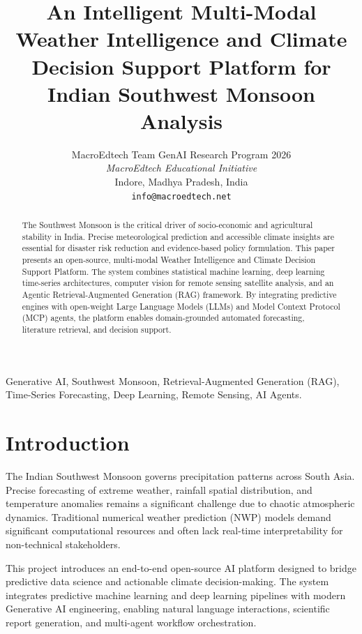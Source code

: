 \documentclass[10pt,journal,compsoc]{IEEEtran}
\begin{document}
\title{An Intelligent Multi-Modal Weather Intelligence and Climate Decision Support Platform for Indian Southwest Monsoon Analysis}

\author{MacroEdtech Team GenAI Research Program 2026\\
\textit{MacroEdtech Educational Initiative}\\
Indore, Madhya Pradesh, India\\
\texttt{info@macroedtech.net}
}

\maketitle

\begin{abstract}
The Southwest Monsoon is the critical driver of socio-economic and agricultural stability in India. Precise meteorological prediction and accessible climate insights are essential for disaster risk reduction and evidence-based policy formulation. This paper presents an open-source, multi-modal Weather Intelligence and Climate Decision Support Platform. The system combines statistical machine learning, deep learning time-series architectures, computer vision for remote sensing satellite analysis, and an Agentic Retrieval-Augmented Generation (RAG) framework. By integrating predictive engines with open-weight Large Language Models (LLMs) and Model Context Protocol (MCP) agents, the platform enables domain-grounded automated forecasting, literature retrieval, and decision support.
\end{abstract}

\begin{IEEEkeywords}
Generative AI, Southwest Monsoon, Retrieval-Augmented Generation (RAG), Time-Series Forecasting, Deep Learning, Remote Sensing, AI Agents.
\end{IEEEkeywords}

\section{Introduction}
The Indian Southwest Monsoon governs precipitation patterns across South Asia. Precise forecasting of extreme weather, rainfall spatial distribution, and temperature anomalies remains a significant challenge due to chaotic atmospheric dynamics. Traditional numerical weather prediction (NWP) models demand significant computational resources and often lack real-time interpretability for non-technical stakeholders.

This project introduces an end-to-end open-source AI platform designed to bridge predictive data science and actionable climate decision-making. The system integrates predictive machine learning and deep learning pipelines with modern Generative AI engineering, enabling natural language interactions, scientific report generation, and multi-agent workflow orchestration.
\end{document}
